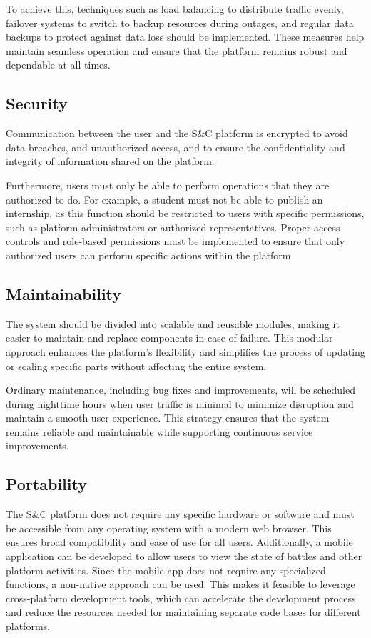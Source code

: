 To achieve this, techniques such as load balancing to distribute traffic evenly, failover systems to switch to backup resources during outages, and regular data backups to protect against data loss should be implemented. These measures help maintain seamless operation and ensure that the platform remains robust and dependable at all times.

\subsection{Security}

Communication between the user and the S\&C platform is encrypted to avoid data breaches, and unauthorized access, and to ensure the confidentiality and integrity of information shared on the platform.

Furthermore, users must only be able to perform operations that they are authorized to do. For example, a student must not be able to publish an internship, as this function should be restricted to users with specific permissions, such as platform administrators or authorized representatives. Proper access controls and role-based permissions must be implemented to ensure that only authorized users can perform specific actions within the platform

 \pagebreak
\subsection{Maintainability}

The system should be divided into scalable and reusable modules, making it easier to maintain and replace components in case of failure. This modular approach enhances the platform's flexibility and simplifies the process of updating or scaling specific parts without affecting the entire system. 

Ordinary maintenance, including bug fixes and improvements, will be scheduled during nighttime hours when user traffic is minimal to minimize disruption and maintain a smooth user experience. This strategy ensures that the system remains reliable and maintainable while supporting continuous service improvements.

\subsection{Portability}

The S\&C platform does not require any specific hardware or software and must be accessible from any operating system with a modern web browser. This ensures broad compatibility and ease of use for all users. Additionally, a mobile application can be developed to allow users to view the state of battles and other platform activities. Since the mobile app does not require any specialized functions, a non-native approach can be used. This makes it feasible to leverage cross-platform development tools, which can accelerate the development process and reduce the resources needed for maintaining separate code bases for different platforms.